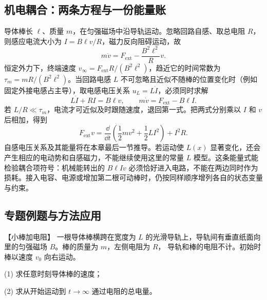 {%
\subsection{机电耦合：两条方程与一份能量账}
导体棒长 $\ell$、质量 $m$，在匀强磁场中沿导轨运动。忽略回路自感、取总电阻 $R$，则感应电流大小为 $I=B\ell v/R$，磁力反向阻碍运动，故
\[
 m\dot v=F_{\mathrm{ext}}-\frac{B^2\ell^2}{R}v.
\]
恒定外力下，终端速度 $v_\infty=F_{\mathrm{ext}}R/(B^2\ell^2)$，趋近它的时间常数为 $\tau_m=mR/(B^2\ell^2)$。当回路电感 $L$ 不可忽略且近似不随棒的位置变化时（例如固定外接电感占主导），取电感电压关系 $u_L=L\dot I$，必须同时求解
\[
 L\dot I+RI=B\ell v,\qquad m\dot v=F_{\mathrm{ext}}-B\ell I.
\]
若 $L/R\ll\tau_m$，电流才可近似及时跟随速度，退回第一式。把两式分别乘以 $I$ 和 $v$ 后相加，得到
\[
 F_{\mathrm{ext}}v=\frac{\dd}{\dd t}\left(\frac12mv^2+\frac12LI^2\right)+I^2R.
\]
自感电压关系及其能量将在本章最后一节推导。若运动使 $L(x)$ 显著变化，还会产生相应的电动势和自感磁力，不能继续使用这里的常量 $L$ 模型。这条能量式能检验耦合项符号：机械能转出的 $B\ell Iv$ 必须恰好进入电路，不能在两边同时作为损耗。接入电容、电源或增加第二根可动棒时，仍按同样顺序增列各自的状态变量与约束。


\subsection{专题例题与方法应用}

\begin{origexamplebox}{【小棒加电阻】}\label{ch24:ex:s40-9-3}
一根导体棒横跨在宽度为 $L$ 的光滑导轨上，导轨间有垂直纸面向里的匀强磁场 $B$。棒的质量为 $m$，左侧电阻为 $R$，
导轨和棒的电阻不计。初始时棒以速度 $v_0$ 向右运动。

(1) 求任意时刻导体棒的速度；

(2) 求从开始运动到 $t\to\infty$ 通过电阻的总电量。

%
\begin{center}\end{center}
\end{origexamplebox}

}

